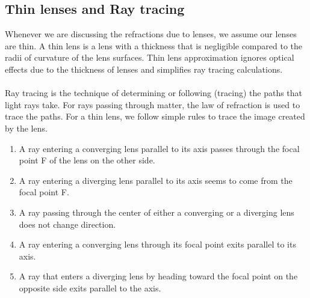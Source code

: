 \documentclass[11pt]{article}
\begin{document}
	 \subsection*{Thin lenses and Ray tracing}
	 Whenever we are discussing the refractions due to lenses, we assume our lenses are thin. A thin lens is a lens with a thickness that is negligible compared to the radii of curvature of the lens surfaces. Thin lens approximation ignores optical effects due to the thickness of lenses and simplifies ray tracing calculations. \\ \\
	 Ray tracing is the technique of determining or following (tracing) the paths that light rays take. For rays passing through matter, the law of refraction is used to trace the paths. For a thin lens, we follow simple rules to trace the image created by the lens.
	 \begin{enumerate}
	 	\item A ray entering a converging lens parallel to its axis passes through the focal point F of the lens on the other side. 
	 	\item A ray entering a diverging lens parallel to its axis seems to come from the focal point F. 
	 	\item A ray passing through the center of either a converging or a diverging lens does not change direction. 
	 	\item A ray entering a converging lens through its focal point exits parallel to its axis. 
	 	\item A ray that enters a diverging lens by heading toward the focal point on the opposite side exits parallel to the axis. 
	 \end{enumerate}
\end{document}
